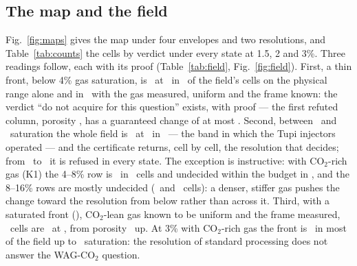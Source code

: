 \documentclass[preprint,11pt,authoryear]{elsarticle}
\begin{document}
\subsection{The map and the field}
Fig.~\ref{fig:maps} gives the map under four envelopes and two resolutions, and Table~\ref{tab:counts} the cells by verdict under every state at 1.5, 2 and 3\%. Three readings follow, each with its proof (Table~\ref{tab:field}, Fig.~\ref{fig:field}). First, a thin front, below 4\% gas saturation, is \vRefuted\ at \DTheta\ in \DThinRefutedZero\ of the field's cells on the physical range alone and in \DThinRefutedFour\ with the gas measured, uniform and the frame known: the verdict ``do not acquire for this question'' exists, with proof --- the first refuted column, porosity \DRefZeroPhi, has a guaranteed change of at most \DRefZeroHi. Second, between \DMidSgLo\ and \DMidSgHi\ saturation the whole field is \vRefused\ at \DTheta\ in \DMidScenarios\ --- the band in which the Tupi injectors operated --- and the certificate returns, cell by cell, the resolution that decides; from \DAllRefusedSgLo\ to \DAllRefusedSgHi\ it is refused in every state. The exception is instructive: with CO$_2$-rich gas (K1) the 4--8\% row is \vRefuted\ in \DKOneRowOneRefuted\ cells and undecided within the budget in \DKOneRowOneOpen, and the 8--16\% rows are mostly undecided (\DKOneRowTwoOpen\ and \DKOneRowThreeOpen\ cells): a denser, stiffer gas pushes the change toward the resolution from below rather than across it. Third, with a saturated front (\DDetFourSg), CO$_2$-lean gas known to be uniform and the frame measured, \DDetFour\ cells are \vProved\ at \DTheta, from porosity \DDetFourPhi\ up. At 3\% with CO$_2$-rich gas the front is \vRefuted\ in most of the field up to \DRefUpKOneThree\ saturation: the resolution of standard processing does not answer the WAG-CO$_2$ question.

\begin{table}[t]
\centering\footnotesize
\caption{The \DCells\ map cells by verdict under each knowledge state at three survey resolutions.}
\label{tab:counts}
\end{table}
\end{document}
